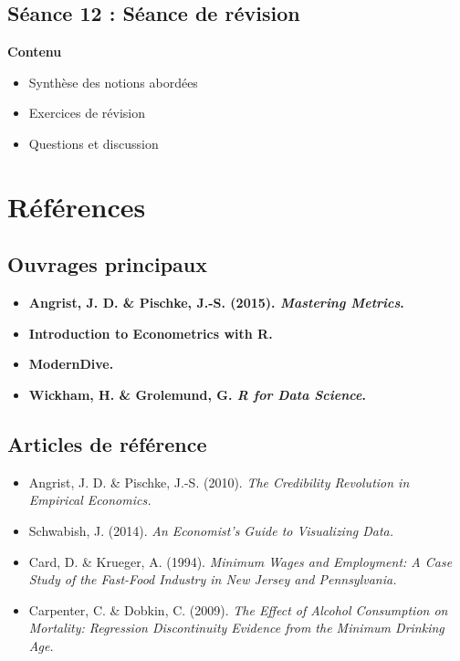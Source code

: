 \documentclass[
  11pt,
]{article}
\providecommand{\tightlist}{%
  \setlength{\itemsep}{0pt}\setlength{\parskip}{0pt}}
\begin{document}
\subsection{Séance 12 : Séance de
révision}\label{suxe9ance-12-suxe9ance-de-ruxe9vision}

\textbf{Contenu}

\begin{itemize}
\tightlist
\item
  Synthèse des notions abordées
\item
  Exercices de révision
\item
  Questions et discussion
\end{itemize}

\section{Références}\label{ruxe9fuxe9rences}

\subsection{Ouvrages principaux}\label{ouvrages-principaux}

\begin{itemize}
\tightlist
\item
  \textbf{Angrist, J. D. \& Pischke, J.-S. (2015). \emph{Mastering
  Metrics}.}
\item
  \textbf{Introduction to Econometrics with R.}
\item
  \textbf{ModernDive.}
\item
  \textbf{Wickham, H. \& Grolemund, G. \emph{R for Data Science}.}
\end{itemize}

\subsection{Articles de référence}\label{articles-de-ruxe9fuxe9rence}

\begin{itemize}
\tightlist
\item
  Angrist, J. D. \& Pischke, J.-S. (2010). \emph{The Credibility
  Revolution in Empirical Economics.}
\item
  Schwabish, J. (2014). \emph{An Economist's Guide to Visualizing Data.}
\item
  Card, D. \& Krueger, A. (1994). \emph{Minimum Wages and Employment: A
  Case Study of the Fast-Food Industry in New Jersey and Pennsylvania.}
\item
  Carpenter, C. \& Dobkin, C. (2009). \emph{The Effect of Alcohol
  Consumption on Mortality: Regression Discontinuity Evidence from the
  Minimum Drinking Age.}
\end{itemize}
\end{document}
